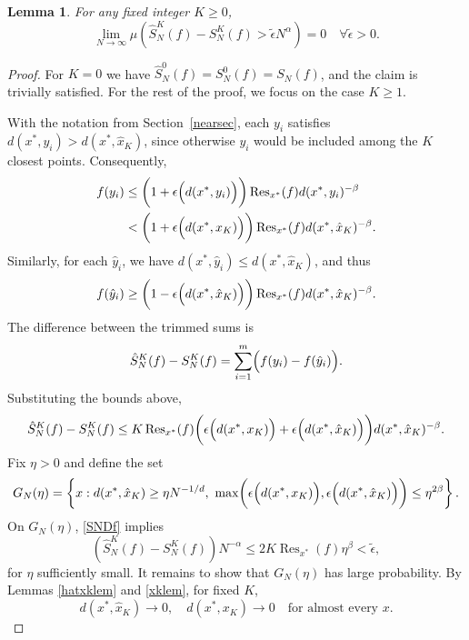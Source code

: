 \documentclass[11pt,twoside,a4paper,reqno]{amsart}
\newtheorem{lemma}[theorem]{Lemma}
\newcommand{\Res}{\operatorname{Res}}
\begin{document}
\begin{lemma}\label{nearlightlem}
For any fixed integer $K\geq 0$,
\begin{equation*}
\lim_{N\rightarrow \infty} \mu\left( \hat{S}_N^K(f)-S_N^K(f)>\tilde\epsilon N^{\alpha}\right)=0 \quad \forall \tilde\epsilon>0.
\end{equation*}
\end{lemma}
\begin{proof}
For $K=0$ we have $\hat{S}_N^0(f)=S_N^0(f)=S_N(f)$, and the claim is trivially satisfied. For the rest of the proof, we focus on the case $K\geq 1$.

With the notation from Section~\ref{nearsec}, each $y_i$ satisfies $d(x^*,y_i)>d(x^*,\hat{x}_K)$, since otherwise $y_i$ would be included among the $K$ closest points. Consequently,
\begin{align*}
f(y_i)&\leq \biggl(1+\epsilon\Bigl(d(x^*,y_i)\Bigr)\biggr)\Res_{x^*}(f) d(x^*,y_i)^{-\beta}\\
&<\biggl(1+\epsilon\Bigl(d(x^*,x_K)\Bigr)\biggr) \Res_{x^*}(f) d(x^*,\hat{x}_K)^{-\beta}.
\end{align*}
Similarly, for each $\hat{y}_i$, we have $d(x^*, \hat{y}_i) \leq d(x^*, \hat{x}_K)$, and thus
\begin{equation*}
f(\hat{y}_i) \geq \biggl(1-\epsilon\Bigl(d(x^*, \hat{x}_K)\Bigr)\biggr)\Res_{x^*}(f) d(x^*, \hat{x}_K)^{-\beta}.
\end{equation*}
The difference between the trimmed sums is
\begin{equation*}
\hat{S}_N^K(f) - S_N^K(f) = \sum_{i=1}^m \Bigl(f(y_i)-f(\hat{y}_i)\Bigr).
\end{equation*}
Substituting the bounds above,
\begin{equation}\label{SNDf}
\hat{S}_N^K(f)-S_N^K(f)\leq K \Res_{x^*}(f)\biggl(\epsilon\Bigl(d(x^*, x_K)\Bigr)+\epsilon\Bigl(d(x^*, \hat{x}_K)\Bigr)\biggr)d(x^*, \hat{x}_K)^{-\beta}.
\end{equation}
Fix $\eta > 0$ and define the set
$$G_N(\eta) = \left\{x : d(x^*,\hat{x}_K) \geq \eta N^{-1/d},\ \max\biggl(\epsilon\Bigl(d(x^*,x_K)\Bigr), \epsilon\Bigl(d(x^*,\hat{x}_K)\Bigr)\biggr) \leq \eta^{2\beta}\right\}.$$
On $G_N(\eta)$, \eqref{SNDf} implies
$$\left(\hat{S}_N^K(f)-S_N^K(f)\right)N^{-\alpha}\leq 2K\Res_{x^*}(f)\eta^{\beta}<\tilde\epsilon,$$
for $\eta$ sufficiently small. It remains to show that $G_N(\eta)$ has large probability. By Lemmas \ref{hatxklem} and \ref{xklem}, for fixed $K$,
$$
d(x^*,\hat{x}_K)\to 0,\quad d(x^*,x_K)\to 0\quad \text{for almost every } x.
$$

\end{proof}
\end{document}
